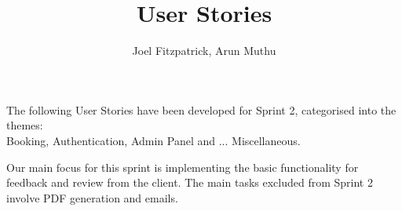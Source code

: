 \documentclass[a4paper, 10pt]{article}
\title{User Stories}
\author{Joel Fitzpatrick, Arun Muthu}
\begin{document}
\setlength{\headsep}{0pt}

\maketitle

\noindent
The following User Stories have been developed for Sprint 2, categorised into the themes: \\
Booking, Authentication, Admin Panel and ... Miscellaneous.\vspace{\baselineskip}

\noindent
Our main focus for this sprint is implementing the basic functionality for feedback and review from the client. 
The main tasks excluded from Sprint 2 involve PDF generation and emails.

\vspace*{1em}
\end{document}
